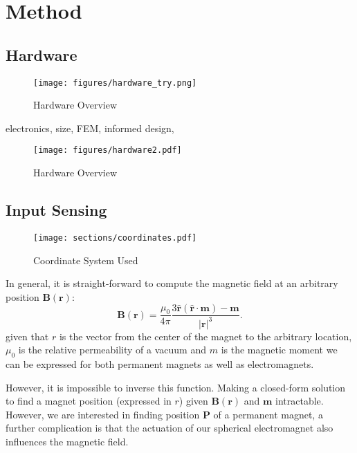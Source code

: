 \section{Method}
\subsection{Hardware}

\begin{figure}
    \centering
    \texttt{[image: figures/hardware\_try.png]}
    \caption{Hardware Overview}
    \label{fig:hardware}
\end{figure}
electronics, size, FEM, informed design, 


\begin{figure*}[!h]
    \centering
    \texttt{[image: figures/hardware2.pdf]}
    \caption{Hardware Overview}
    \label{fig:hardware}
\end{figure*}

\subsection{Input Sensing}
\begin{figure}
    \centering
    \texttt{[image: sections/coordinates.pdf]}
    \caption{Coordinate System Used}
    \label{fig:coordinates}
\end{figure}

In general, it is straight-forward to compute the magnetic field at an arbitrary position $\mathbf{B}(\mathbf{r})$:
\begin{equation}
    \mathbf {B} (\mathbf {r} )={\frac {\mu _{0}}{4\pi }}{\frac {3\mathbf {\hat {r}} (\mathbf {\hat {r}} \cdot \mathbf {m} )-\mathbf {m} }{|\mathbf {r} |^{3}}}.
    \label{eq:basic_B}
\end{equation}
given that $r$ is the vector from the center of the magnet to the arbitrary location, $\mu_0$ is the relative permeability of a vacuum and $m$ is the magnetic moment we can be expressed for both permanent magnets as well as electromagnets. 

However, it is impossible to inverse this function. Making a closed-form solution to find a magnet position (expressed in $r$) given $\mathbf{B}(\mathbf{r})$ and $\mathbf{m}$ intractable. However, we are interested in finding position $\mathbf{P}$ of a permanent magnet, a further complication is that the actuation of our spherical electromagnet also influences the magnetic field. 

